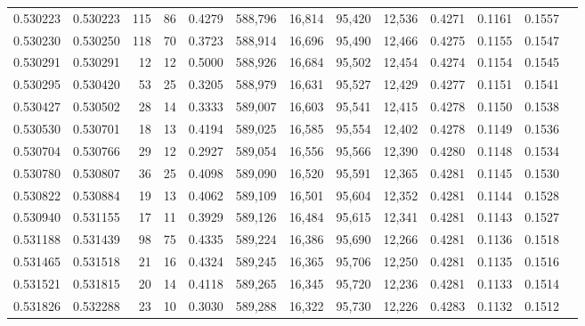 \begin{tabular}{rrrrrrrrrrrrr}
0.530223 & 0.530223 &   115 &    86 &                                     0.4279 & 588,796 &  16,814 &  95,420 &  12,536 & 0.4271 & 0.1161 & 0.1557 \\
0.530230 & 0.530250 &   118 &    70 &                                     0.3723 & 588,914 &  16,696 &  95,490 &  12,466 & 0.4275 & 0.1155 & 0.1547 \\
0.530291 & 0.530291 &    12 &    12 &                                     0.5000 & 588,926 &  16,684 &  95,502 &  12,454 & 0.4274 & 0.1154 & 0.1545 \\
0.530295 & 0.530420 &    53 &    25 &                                     0.3205 & 588,979 &  16,631 &  95,527 &  12,429 & 0.4277 & 0.1151 & 0.1541 \\
0.530427 & 0.530502 &    28 &    14 &                                     0.3333 & 589,007 &  16,603 &  95,541 &  12,415 & 0.4278 & 0.1150 & 0.1538 \\
0.530530 & 0.530701 &    18 &    13 &                                     0.4194 & 589,025 &  16,585 &  95,554 &  12,402 & 0.4278 & 0.1149 & 0.1536 \\
0.530704 & 0.530766 &    29 &    12 &                                     0.2927 & 589,054 &  16,556 &  95,566 &  12,390 & 0.4280 & 0.1148 & 0.1534 \\
0.530780 & 0.530807 &    36 &    25 &                                     0.4098 & 589,090 &  16,520 &  95,591 &  12,365 & 0.4281 & 0.1145 & 0.1530 \\
0.530822 & 0.530884 &    19 &    13 &                                     0.4062 & 589,109 &  16,501 &  95,604 &  12,352 & 0.4281 & 0.1144 & 0.1528 \\
0.530940 & 0.531155 &    17 &    11 &                                     0.3929 & 589,126 &  16,484 &  95,615 &  12,341 & 0.4281 & 0.1143 & 0.1527 \\
0.531188 & 0.531439 &    98 &    75 &                                     0.4335 & 589,224 &  16,386 &  95,690 &  12,266 & 0.4281 & 0.1136 & 0.1518 \\
0.531465 & 0.531518 &    21 &    16 &                                     0.4324 & 589,245 &  16,365 &  95,706 &  12,250 & 0.4281 & 0.1135 & 0.1516 \\
0.531521 & 0.531815 &    20 &    14 &                                     0.4118 & 589,265 &  16,345 &  95,720 &  12,236 & 0.4281 & 0.1133 & 0.1514 \\
0.531826 & 0.532288 &    23 &    10 &                                     0.3030 & 589,288 &  16,322 &  95,730 &  12,226 & 0.4283 & 0.1132 & 0.1512 \\

\end{tabular}
